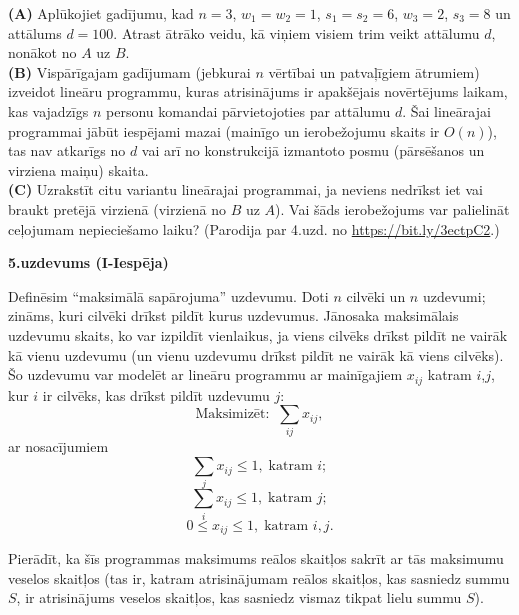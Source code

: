 \documentclass[a4paper,12pt]{article}
\begin{document}
\vspace{4pt}
{\bf (A)} Aplūkojiet gadījumu, kad $n = 3$, 
$w_1 = w_2 = 1$, $s_1 = s_2 = 6$, $w_3 = 2$, $s_3 = 8$ un
attālums $d = 100$. Atrast ātrāko veidu, 
kā viņiem visiem trim veikt
attālumu $d$, nonākot no $A$ uz $B$.\\
{\bf (B)} Vispārīgajam gadījumam (jebkurai $n$ 
vēr\-tī\-bai un patvaļīgiem ātrumiem) izveidot lineāru programmu, 
kuras atrisinājums ir apakšējais 
no\-vēr\-tē\-jums laikam, 
kas vajadzīgs $n$ personu komandai 
pārvietojoties par attālumu $d$. 
Šai li\-ne\-ā\-ra\-jai programmai jābūt iespējami mazai 
(mainīgo un ierobežojumu skaits ir $O(n)$), 
tas nav atkarīgs no $d$ vai arī no konstrukcijā 
izmantoto posmu (pār\-sē\-ša\-nos un virziena maiņu) skaita.\\
{\bf (C)} Uzrakstīt citu variantu lineārajai programmai, ja neviens nedrīkst iet vai braukt
pretējā virzienā (virzienā no $B$ uz $A$). Vai šāds ierobežojums var palielināt 
ceļojumam nepieciešamo lai\-ku? (Parodija 
par 4.uzd. no \url{https://bit.ly/3ectpC2}.)










\vspace{20pt}
{\bf 5.uzdevums (I-Iespēja)}

Definēsim ``maksimālā sapārojuma'' uzdevumu. 
Doti $n$ cilvēki un $n$ uzdevumi; zināms, kuri cilvēki drīkst pildīt kurus uzdevumus. 
Jānosaka maksimālais uzdevumu
skaits, ko var izpildīt vienlaikus, ja viens cilvēks drīkst pildīt ne vairāk
kā vienu uzdevumu (un vienu uzdevumu drīkst pildīt ne vairāk kā viens
cilvēks). Šo uzdevumu var modelēt ar lineāru programmu ar mainīgajiem
$x_{ij}$ katram $i$,$j$, kur $i$ ir cilvēks, kas drīkst pildīt uzdevumu $j$:
$$\text{Maksimizēt:}\;\;\sum\limits_{ij} x_{ij},$$
ar nosacījumiem
$$\sum\limits_{j} x_{ij} \leq 1,\;\mbox{katram $i$};$$
$$\sum\limits_{i} x_{ij} \leq 1,\;\mbox{katram $j$};$$
$$0 \leq x_{ij} \leq 1,\;\mbox{katram $i,j$}.$$

Pierādīt, ka šīs programmas maksimums reālos skaitļos sakrīt ar tās 
maksimumu veselos skaitļos (tas ir, katram atrisinājumam reālos skaitļos, kas
sasniedz summu $S$, ir atrisinājums veselos skait\-ļos, kas sasniedz vismaz
tikpat lielu summu $S$).
\end{document}
